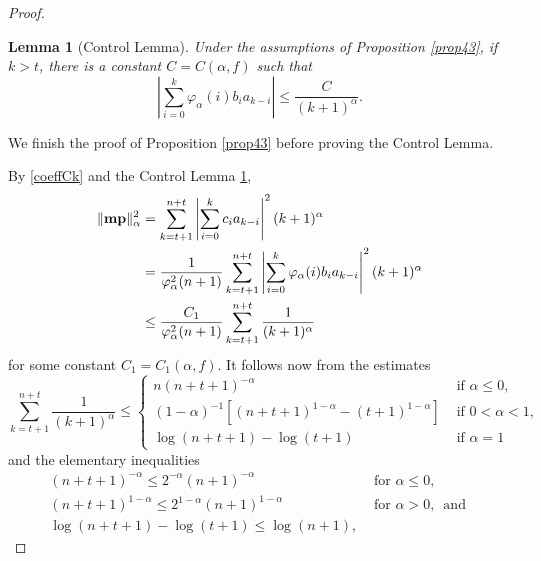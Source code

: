 \documentclass[11 pt,reqno]{amsart}
\newtheorem{lem}[thm]{Lemma}
\theoremstyle{definition}
\theoremstyle{remark}
\numberwithin{equation}{section} \numberwithin{figure}{section}
\begin{document}
\begin{proof}
            \begin{lem}[Control Lemma]\label{fundamental}
            Under the assumptions of Proposition \ref{prop43}, if $k>t$, there is a constant
            $C=C(\alpha,f)$ such that
            \[  \left|\sum_{i=0}^k \varphi_{\alpha}(i) b_i a_{k-i}\right|
                    \leq \frac{C}{(k+1)^{\alpha}}.  \]
            \end{lem}

            We finish the proof of Proposition \ref{prop43} before proving the Control
            Lemma.

            By \eqref{coeffCk} and the Control Lemma \ref{fundamental},
            \begin{align*}
                        \|{\bf mp}\|^2_\alpha
                        &=\sum_{k=t+1}^{n+t} \left|\sum_{i=0}^k c_ia_{k-i}\right|^2 (k+1)^\alpha\\
                        &=\frac{1}{\varphi_{\alpha}^{2}(n+1)}\sum_{k=t+1}^{n+t} \left|\sum_{i=0}^k
                        \varphi_{\alpha}(i)b_{i}a_{k-i}\right|^2 (k+1)^\alpha\\
                        &\leq\frac{C_{1}}{\varphi_{\alpha}^{2}(n+1)}\sum_{k=t+1}^{n+t}
                        \frac{1}{(k+1)^{\alpha}}
            \end{align*}
            for some constant $C_{1}=C_{1}(\alpha,f)$.  It follows now from the estimates
            \[  \sum_{k=t+1}^{n+t} \frac{1}{(k+1)^{\alpha}}\leq\left\{
                    \begin{array}{ll}
                                n(n+t+1)^{-\alpha}\;&\text{ if }\alpha\leq0,\\
                                (1-\alpha)^{-1}[(n+t+1)^{1-\alpha}-(t+1)^{1-\alpha}]&\text{ if }0<\alpha<1,\\
                                \log(n+t+1)-\log(t+1)&\text{ if }\alpha=1
                    \end{array}\right.  \]
            and the elementary inequalities
            \begin{equation*}
                        \begin{array}{ll}
                                    (n+t+1)^{-\alpha}\leq2^{-\alpha}(n+1)^{-\alpha}\;&\text{ for }\alpha\leq0,\\
                                    (n+t+1)^{1-\alpha}\leq2^{1-\alpha}(n+1)^{1-\alpha}&\text{ for }\alpha>0,
                                    \,\text{ and }\\
                                    \log(n+t+1)-\log(t+1)\leq\log(n+1),

\end{array}
\end{equation*}
\end{proof}
\end{document}
